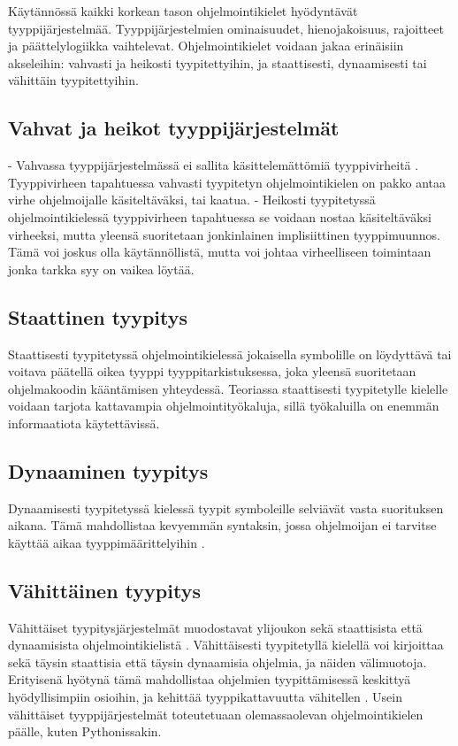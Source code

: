 \begin{otherlanguage}{finnish}
Käytännössä kaikki korkean tason ohjelmointikielet hyödyntävät tyyppijärjestelmää. Tyyppijärjestelmien ominaisuudet, hienojakoisuus, rajoitteet ja päättelylogiikka vaihtelevat. Ohjelmointikielet voidaan jakaa erinäisiin akseleihin: vahvasti ja heikosti tyypitettyihin, ja staattisesti, dynaamisesti tai vähittäin tyypitettyihin.

\subsection*{Vahvat ja heikot tyyppijärjestelmät}
- Vahvassa tyyppijärjestelmässä ei sallita käsittelemättömiä tyyppivirheitä \cite{cardelli_typeful_1989}. Tyyppivirheen tapahtuessa vahvasti tyypitetyn ohjelmointikielen on pakko antaa virhe ohjelmoijalle käsiteltäväksi, tai kaatua.
- Heikosti tyypitetyssä ohjelmointikielessä tyyppivirheen tapahtuessa se voidaan nostaa käsiteltäväksi virheeksi, mutta yleensä suoritetaan jonkinlainen implisiittinen tyyppimuunnos. Tämä voi joskus olla käytännöllistä, mutta voi johtaa virheelliseen toimintaan jonka tarkka syy on vaikea löytää.
\subsection*{Staattinen tyypitys}
Staattisesti tyypitetyssä ohjelmointikielessä jokaisella symbolille on löydyttävä tai voitava päätellä oikea tyyppi tyyppitarkistuksessa, joka yleensä suoritetaan ohjelmakoodin kääntämisen yhteydessä. Teoriassa staattisesti tyypitetylle kielelle voidaan tarjota kattavampia ohjelmointityökaluja, sillä työkaluilla on enemmän informaatiota käytettävissä.

\subsection*{Dynaaminen tyypitys}
Dynaamisesti tyypitetyssä kielessä tyypit symboleille selviävät vasta suorituksen aikana. Tämä mahdollistaa kevyemmän syntaksin, jossa ohjelmoijan ei tarvitse käyttää aikaa tyyppimäärittelyihin \cite{di_grazia_evolution_2022}.

\subsection*{Vähittäinen tyypitys}

Vähittäiset tyypitysjärjestelmät muodostavat ylijoukon sekä staattisista että dynaamisista ohjelmointikielistä \cite{siek_refined_gradual_2015}. Vähittäisesti tyypitetyllä kielellä voi kirjoittaa sekä täysin staattisia että täysin dynaamisia ohjelmia, ja näiden välimuotoja. Erityisenä hyötynä tämä mahdollistaa ohjelmien tyypittämisessä keskittyä hyödyllisimpiin osioihin, ja kehittää tyyppikattavuutta vähitellen \cite{siek_refined_gradual_2015}. Usein vähittäiset tyyppijärjestelmät toteutetuaan olemassaolevan ohjelmointikielen päälle, kuten Pythonissakin.


\end{otherlanguage}
